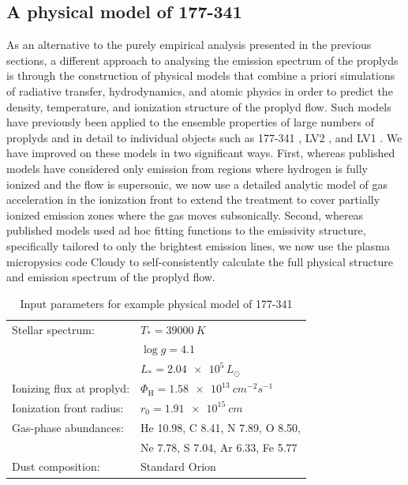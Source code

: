 \documentclass[useAMS,usenatbib]{mn2e}
\begin{document}
\addtocounter{section}{6}
\addtocounter{subsection}{2}
\addtocounter{table}{5}
\addtocounter{figure}{9}


\subsection{A physical model of 177-341}
As an alternative to the purely empirical analysis presented in the previous sections, a different approach to analysing the emission spectrum of the proplyds is through the construction of physical models that combine a priori simulations of radiative transfer, hydrodynamics, and atomic physics in order to predict the density, temperature, and ionization structure of the proplyd flow.  
Such models have previously been applied to the ensemble properties of large numbers of proplyds \citep*{1998ApJ...499..758J, 1998AJ....116..322H} and in detail to individual objects such as 177-341 \citep{1999AJ....118.2350H}, LV2 \citep{2002ApJ...566..315H}, and LV1 \citep{2002ApJ...570..222G}. 
We have improved on these models in two significant ways.
First, whereas published models have considered only emission from regions where hydrogen is fully ionized and the flow is supersonic, we now use a detailed analytic model of gas acceleration in the ionization front \citep{2005ApJ...621..328H} to extend the treatment to cover partially ionized emission zones where the gas moves subsonically. 
Second, whereas published models used ad hoc fitting functions to the emissivity structure, specifically tailored to only the brightest emission lines, we now use the plasma micropysics code Cloudy \citep{1998PASP..110..761F} to self-consistently calculate the full physical structure and emission spectrum of the proplyd flow. 

\begin{table}
  \centering
  \caption{Input parameters for example physical model of 177-341} 
  \begin{tabular}{@{\,}ll@{\,}}\hline
    Stellar spectrum:& 
    \(T_* = \SI{39000}{K}\)\\
    \citep{2006AandA...448..351S} & \(\log g = 4.1\)\\
    & \(L_* = \num{2.04e5}\,L_\odot\)\\
    Ionizing flux at proplyd:& 
    \(\Phi_{\mathrm{H}} = \SI{1.58e13}{cm^{-2} s^{-1}}\)
    \\
    Ionization front radius:& 
    \(r_0 = \SI{1.91e15}{cm}\)
    \\
    Gas-phase abundances: & 
    He 10.98, C 8.41, N 7.89, O 8.50, \\
    & Ne 7.78, S 7.04, Ar 6.33, Fe 5.77
    \\
    Dust composition: & Standard Orion \citep{1991ApJ...374..580B}\\
    \hline
  \end{tabular}
  \label{tab:model:pars}
\end{table}
\end{document}
